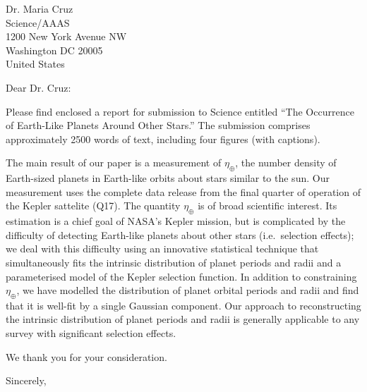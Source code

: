 \documentclass{letter}
\begin{document}
\begin{letter}{Dr. Maria Cruz\\Science/AAAS\\1200 New York Avenue NW\\Washington DC 20005\\United States}

  \opening{Dear Dr. Cruz:}

  Please find enclosed a report for submission to Science entitled
  ``The Occurrence of Earth-Like Planets Around Other Stars.''  The
  submission comprises approximately 2500 words of text, including
  four figures (with captions).

  The main result of our paper is a measurement of $\eta_\oplus$, the
  number density of Earth-sized planets in Earth-like orbits about
  stars similar to the sun.  Our measurement uses the complete data
  release from the final quarter of operation of the Kepler sattelite
  (Q17).  The quantity $\eta_\oplus$ is of broad scientific interest.
  Its estimation is a chief goal of NASA's Kepler mission, but is
  complicated by the difficulty of detecting Earth-like planets about
  other stars (i.e.\ selection effects); we deal with this difficulty
  using an innovative statistical technique that simultaneously fits
  the intrinsic distribution of planet periods and radii and a
  parameterised model of the Kepler selection function.  In addition
  to constraining $\eta_\oplus$, we have modelled the distribution of
  planet orbital periods and radii and find that it is well-fit by a
  single Gaussian component.  Our approach to reconstructing the
  intrinsic distribution of planet periods and radii is generally
  applicable to any survey with significant selection effects.

  We thank you for your consideration.

  \closing{Sincerely,}

  
\end{letter}
\end{document}
